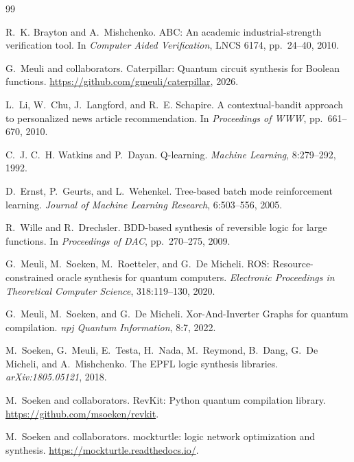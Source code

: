 \documentclass[UTF8,fontset=fandol,11pt]{ctexart}
\begin{document}
\begin{thebibliography}{99}

R.~K. Brayton and A.~Mishchenko.
\newblock ABC: An academic industrial-strength verification tool.
\newblock In \emph{Computer Aided Verification}, LNCS 6174, pp.~24--40, 2010.

G.~Meuli and collaborators.
\newblock Caterpillar: Quantum circuit synthesis for Boolean functions.
\newblock \url{https://github.com/gmeuli/caterpillar}, 2026.

L.~Li, W.~Chu, J.~Langford, and R.~E. Schapire.
\newblock A contextual-bandit approach to personalized news article recommendation.
\newblock In \emph{Proceedings of WWW}, pp.~661--670, 2010.

C.~J. C.~H. Watkins and P.~Dayan.
\newblock Q-learning.
\newblock \emph{Machine Learning}, 8:279--292, 1992.

D.~Ernst, P.~Geurts, and L.~Wehenkel.
\newblock Tree-based batch mode reinforcement learning.
\newblock \emph{Journal of Machine Learning Research}, 6:503--556, 2005.

R.~Wille and R.~Drechsler.
\newblock BDD-based synthesis of reversible logic for large functions.
\newblock In \emph{Proceedings of DAC}, pp.~270--275, 2009.

G.~Meuli, M.~Soeken, M.~Roetteler, and G.~De Micheli.
\newblock ROS: Resource-constrained oracle synthesis for quantum computers.
\newblock \emph{Electronic Proceedings in Theoretical Computer Science}, 318:119--130, 2020.

G.~Meuli, M.~Soeken, and G.~De Micheli.
\newblock Xor-And-Inverter Graphs for quantum compilation.
\newblock \emph{npj Quantum Information}, 8:7, 2022.

M.~Soeken, G.~Meuli, E.~Testa, H.~Nada, M.~Reymond, B.~Dang, G.~De Micheli, and A.~Mishchenko.
\newblock The EPFL logic synthesis libraries.
\newblock \emph{arXiv:1805.05121}, 2018.

M.~Soeken and collaborators.
\newblock RevKit: Python quantum compilation library.
\newblock \url{https://github.com/msoeken/revkit}.

M.~Soeken and collaborators.
\newblock mockturtle: logic network optimization and synthesis.
\newblock \url{https://mockturtle.readthedocs.io/}.


\end{thebibliography}
\end{document}
